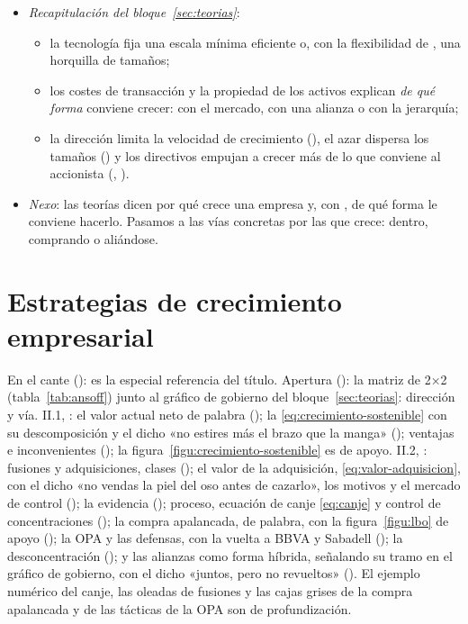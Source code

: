 \documentclass[11pt]{article}
\begin{document}
\begin{itemize}
\item \emph{Recapitulación del bloque~\ref{sec:teorias}}:
  \begin{itemize}
  \item la tecnología fija una escala mínima eficiente o, con la flexibilidad de , una horquilla de tamaños;
  \item los costes de transacción y la propiedad de los activos explican \emph{de qué forma} conviene crecer: con el mercado, con una alianza o con la jerarquía;
  \item la dirección limita la velocidad de crecimiento (), el azar dispersa los tamaños () y los directivos empujan a crecer más de lo que conviene al accionista (, ).
  \end{itemize}
\item \emph{Nexo}: las teorías dicen por qué crece una empresa y, con , de qué forma le conviene hacerlo. Pasamos a las vías concretas por las que crece: dentro, comprando o aliándose.
\end{itemize}

\section{Estrategias de crecimiento empresarial}\label{sec:estrategias}

\begin{notaopositor}
En el cante (): es la especial referencia del título. Apertura (): la matriz de  2×2 (tabla~\ref{tab:ansoff}) junto al gráfico de gobierno del bloque~\ref{sec:teorias}: dirección y vía. II.1, : el valor actual neto de palabra (); la \eqref{eq:crecimiento-sostenible} con su descomposición y el dicho «no estires más el brazo que la manga» (); ventajas e inconvenientes (); la figura~\ref{figu:crecimiento-sostenible} es de apoyo. II.2, : fusiones y adquisiciones, clases (); el valor de la adquisición, \eqref{eq:valor-adquisicion}, con el dicho «no vendas la piel del oso antes de cazarlo», los motivos y el mercado de control (); la evidencia (); proceso, ecuación de canje \eqref{eq:canje} y control de concentraciones (); la compra apalancada, de palabra, con la figura~\ref{figu:lbo} de apoyo (); la OPA y las defensas, con la vuelta a BBVA y Sabadell (); la desconcentración (); y las alianzas como forma híbrida, señalando su tramo en el gráfico de gobierno, con el dicho «juntos, pero no revueltos» (). El ejemplo numérico del canje, las oleadas de fusiones y las cajas grises de la compra apalancada y de las tácticas de la OPA son de profundización.
\end{notaopositor}
\end{document}
